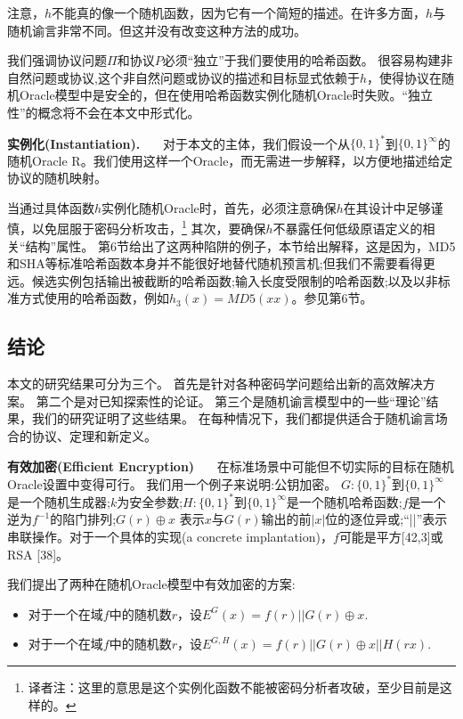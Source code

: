 \documentclass[]{article}
\begin{document}
	注意，$h$不能真的像一个随机函数，因为它有一个简短的描述。在许多方面，$h$与随机谕言非常不同。但这并没有改变这种方法的成功。
	
	
	我们强调协议问题$\Pi$和协议$P$必须“独立”于我们要使用的哈希函数。
	很容易构建非自然问题或协议,这个非自然问题或协议的描述和目标显式依赖于$h$，使得协议在随机Oracle模型中是安全的，但在使用哈希函数实例化随机Oracle时失败。“独立性”的概念将不会在本文中形式化。
	
	
    \textbf{实例化(Instantiation).} \ \ \ 
    对于本文的主体，我们假设一个从$\{0,1\}^*$到$\{0,1\}^\infty$的随机Oracle R。我们使用这样一个Oracle，而无需进一步解释，以方便地描述给定协议的随机映射。


    当通过具体函数$h$实例化随机Oracle时，首先，必须注意确保$h$在其设计中足够谨慎，以免屈服于密码分析攻击，\footnote{译者注：这里的意思是这个实例化函数不能被密码分析者攻破，至少目前是这样的。}
    其次，要确保$h$不暴露任何低级原语定义的相关“结构”属性。
    第6节给出了这两种陷阱的例子，本节给出解释，这是因为，MD5和SHA等标准哈希函数本身并不能很好地替代随机预言机;但我们不需要看得更远。候选实例包括输出被截断的哈希函数;输入长度受限制的哈希函数;以及以非标准方式使用的哈希函数，例如$h_3(x)=MD5(xx)$。参见第6节。
    
    
    \subsection{结论}
    本文的研究结果可分为三个。
    首先是针对各种密码学问题给出新的高效解决方案。
    第二个是对已知探索性的论证。
    第三个是随机谕言模型中的一些“理论”结果，我们的研究证明了这些结果。
    在每种情况下，我们都提供适合于随机谕言场合的协议、定理和新定义。
    
    
    \textbf{有效加密(Efficient Encryption) }\ \ \ 
    在标准场景中可能但不切实际的目标在随机Oracle设置中变得可行。
    我们用一个例子来说明:公钥加密。
    $G:\{0,1\}^*$到$\{0,1\}^\infty$是一个随机生成器;$k$为安全参数;$H:\{0,1\}^*$到$\{0,1\}^\infty$是一个随机哈希函数;$f$是一个逆为$f^{-1}$的陷门排列;$G(r)\oplus x$ 表示$x$与$G(r)$输出的前$|x|$位的逐位异或;“||”表示串联操作。对于一个具体的实现(a concrete implantation)，$f$可能是平方[42,3]或RSA [38]。
    
    
    
    我们提出了两种在随机Oracle模型中有效加密的方案:
    \begin{itemize}
    	\item 对于一个在域$f$中的随机数$r$，设$E^G(x)=f(r) || G(r)\oplus x$.
    	\item 对于一个在域$f$中的随机数$r$，设$E^{G,H}(x)=f(r) || G(r)\oplus x || H(rx)$.
    \end{itemize}
\end{document}
